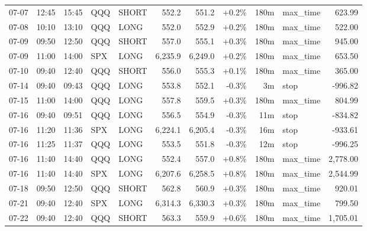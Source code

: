 \documentclass[11pt,a4paper,twoside]{article}
\begin{document}
\begin{center}
\begin{longtable}{>{\color{txtmain}}l l l l l r r r r >{\color{txtmain}}l r}
07-07 & 12:45 & 15:45 & QQQ & SHORT & 552.2 & 551.2 & \textcolor{wingreen}{+0.2\%} & 180m & max\_time & \textcolor{wingreen}{623.99} \\
07-08 & 10:10 & 13:10 & QQQ & LONG & 552.0 & 552.9 & \textcolor{wingreen}{+0.2\%} & 180m & max\_time & \textcolor{wingreen}{522.00} \\
07-09 & 09:50 & 12:50 & QQQ & SHORT & 557.0 & 555.1 & \textcolor{wingreen}{+0.3\%} & 180m & max\_time & \textcolor{wingreen}{945.00} \\
07-09 & 11:00 & 14:00 & SPX & LONG & 6,235.9 & 6,249.0 & \textcolor{wingreen}{+0.2\%} & 180m & max\_time & \textcolor{wingreen}{653.50} \\
07-10 & 09:40 & 12:40 & QQQ & SHORT & 556.0 & 555.3 & \textcolor{wingreen}{+0.1\%} & 180m & max\_time & \textcolor{wingreen}{365.00} \\
07-14 & 09:40 & 09:43 & QQQ & LONG & 553.8 & 552.1 & \textcolor{lossred}{-0.3\%} & 3m & stop & \textcolor{lossred}{-996.82} \\
07-15 & 11:00 & 14:00 & QQQ & LONG & 557.8 & 559.5 & \textcolor{wingreen}{+0.3\%} & 180m & max\_time & \textcolor{wingreen}{804.99} \\
07-16 & 09:40 & 09:51 & QQQ & LONG & 556.5 & 554.9 & \textcolor{lossred}{-0.3\%} & 11m & stop & \textcolor{lossred}{-834.82} \\
07-16 & 11:20 & 11:36 & SPX & LONG & 6,224.1 & 6,205.4 & \textcolor{lossred}{-0.3\%} & 16m & stop & \textcolor{lossred}{-933.61} \\
07-16 & 11:25 & 11:37 & QQQ & LONG & 553.5 & 551.8 & \textcolor{lossred}{-0.3\%} & 12m & stop & \textcolor{lossred}{-996.25} \\
07-16 & 11:40 & 14:40 & QQQ & LONG & 552.4 & 557.0 & \textcolor{wingreen}{+0.8\%} & 180m & max\_time & \textcolor{wingreen}{2,778.00} \\
07-16 & 11:40 & 14:40 & SPX & LONG & 6,207.6 & 6,258.5 & \textcolor{wingreen}{+0.8\%} & 180m & max\_time & \textcolor{wingreen}{2,544.99} \\
07-18 & 09:50 & 12:50 & QQQ & SHORT & 562.8 & 560.9 & \textcolor{wingreen}{+0.3\%} & 180m & max\_time & \textcolor{wingreen}{920.01} \\
07-21 & 09:40 & 12:40 & SPX & LONG & 6,314.3 & 6,330.3 & \textcolor{wingreen}{+0.3\%} & 180m & max\_time & \textcolor{wingreen}{799.50} \\
07-22 & 09:40 & 12:40 & QQQ & SHORT & 563.3 & 559.9 & \textcolor{wingreen}{+0.6\%} & 180m & max\_time & \textcolor{wingreen}{1,705.01} \\

\end{longtable}
\end{center}
\end{document}
